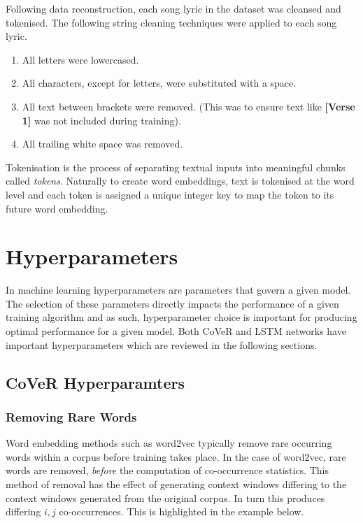 \noindent
\newline
Following data reconstruction, each song lyric in the dataset was cleansed and tokenised. The following string cleaning techniques were applied to each song lyric.

\begin{enumerate}
	\item All letters were lowercased.
	\item All characters, except for letters, were substituted with a space.
	\item All text between brackets were removed. (This was to ensure text like \textbf{[Verse 1]} was not included during training).
	\item All trailing white space was removed.
\end{enumerate}

\noindent
\newline
Tokenisation is the process of separating textual inputs into meaningful chunks called \textit{tokens}. Naturally to create word embeddings, text is tokenised at the word level and each token is assigned a unique integer key to map the token to its future word embedding.

\section{Hyperparameters}
In machine learning hyperparameters are parameters that govern a given model. The selection of these parameters directly impacts the performance of a given training algorithm and as such, hyperparameter choice is important for producing optimal performance for a given model. Both CoVeR and LSTM networks have important hyperparameters which are reviewed in the following sections.
\subsection{CoVeR Hyperparamters}
\subsubsection{Removing Rare Words}
Word embedding methods such as word2vec typically remove rare occurring words within a corpus before training takes place. In the case of word2vec, rare words are removed, \textit{before} the computation of co-occurrence statistics. This method of removal has the effect of generating  context windows differing to the context windows generated from the original corpus. In turn this produces differing \(i,j\) co-occurrences. This is highlighted in the example below.

